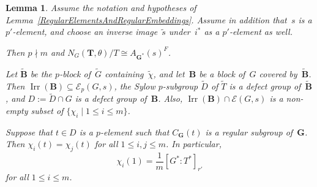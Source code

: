 \documentclass[12pt]{amsart}
\newcommand{\bG}{{\mathbf{G}}}      %
\newcommand{\bB}{{\mathbf{B}}}
\newcommand{\bT}{{\mathbf{T}}}
\DeclareMathOperator{\Irr}{Irr}
\newtheorem{lem}[thm]{Lemma}
\theoremstyle{theorem}
\theoremstyle{definition}
\theoremstyle{remark}
\begin{document}
\begin{lem}
\label{GeneralizedRegularBlocks}
Assume the notation and hypotheses of 
{\rm Lemma~\ref{RegularElementsAndRegularEmbeddings}}. Assume in addition 
that~$s$ is a $p'$-element, and choose an inverse image~$\tilde{s}$ 
under~$i^*$ as a $p'$-element as well. 

Then $p \nmid m$ and $N_G( \bT, \theta )/T \cong A_{\bG^*}( s )^F$.

Let $\tilde{\bB}$ be the $p$-block of~$\tilde{G}$ containing~$\tilde{\chi}$,
and let~$\bB$ be a block of~$G$ covered by~$\tilde{\bB}$. Then $\Irr( \bB )
\subseteq \mathcal{E}_p( G, s )$, the Sylow 
$p$-subgroup $\tilde{D}$ of $\tilde{T}$ is a defect group of~$\tilde{\bB}$, and 
$D := \tilde{D} \cap G$ is a defect group of~$\bB$. Also, $\Irr( \bB ) \cap
\mathcal{E}( G, s )$ is a non-empty subset of 
$\{ \chi_i \mid 1 \leq i \leq m \}$. 

Suppose that $t \in D$ is a $p$-element such that $C_{\bG}( t )$ is a regular
subgroup of~$\bG$.
Then $\chi_i( t ) = \chi_j( t )$ for all $1 \leq i, j \leq m$. In particular,
$$\chi_i(1) = \frac{1}{m}[G^*\colon\!T^*]_{r'}$$
for all $1 \leq i \leq m$.
\end{lem}
\end{document}

